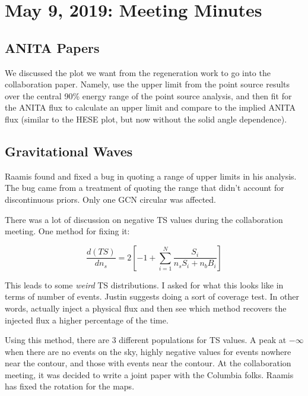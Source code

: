 \chapter{May 9, 2019: Meeting Minutes}


\section{ANITA Papers}
We discussed the plot we want from the regeneration work to go into the collaboration paper. Namely, use the upper limit from the point source results over the central 90\% energy range of the point source analysis, and then fit for the ANITA flux to calculate an upper limit and compare to the implied ANITA flux (similar to the HESE plot, but now without the solid angle dependence).

\section{Gravitational Waves}
Raamis found and fixed a bug in quoting a range of upper limits in his analysis. The bug came from a treatment of quoting the range that didn't account for discontinuous priors. Only one GCN circular was affected. 


\vspace{0.01in}

There was a lot of discussion on negative TS values during the collaboration meeting. One method for fixing it:

\begin{equation}
    \frac{d(TS)}{dn_s} = 2 \left[ -1 + \sum_{i=1}^N\frac{S_i}{n_sS_i + n_bB_i} \right]
\end{equation}

This leads to some \textit{weird} TS distributions. I asked for what this looks like in terms of number of events. Justin suggests doing a sort of coverage test. In other words, actually inject a physical flux and then see which method recovers the injected flux a higher percentage of the time. 

Using this method, there are 3 different populations for TS values. A peak at $-\infty$ when there are no events on the sky, highly negative values for events nowhere near the contour, and those with events near the contour. At the collaboration meeting, it was decided to write a joint paper with the Columbia folks. Raamis has fixed the rotation for the maps. 

